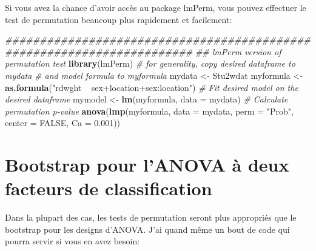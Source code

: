 \documentclass[12pt,]{book}
\newenvironment{Shaded}{\begin{snugshade}}{\end{snugshade}}
\newcommand{\CommentTok}[1]{\textcolor[rgb]{0.37,0.37,0.37}{\textit{#1}}}
\newcommand{\DataTypeTok}[1]{\textcolor[rgb]{0.27,0.27,0.27}{#1}}
\newcommand{\FloatTok}[1]{\textcolor[rgb]{0.06,0.06,0.06}{#1}}
\newcommand{\KeywordTok}[1]{\textcolor[rgb]{0.27,0.27,0.27}{\textbf{#1}}}
\newcommand{\NormalTok}[1]{#1}
\newcommand{\OtherTok}[1]{\textcolor[rgb]{0.37,0.37,0.37}{#1}}
\newcommand{\StringTok}[1]{\textcolor[rgb]{0.5,0.5,0.5}{#1}}
\begin{document}
Si vous avez la chance d'avoir accès au package lmPerm, vous pouvez effectuer le test de permutation beaucoup plus rapidement et facilement:

\begin{Shaded}
\begin{Highlighting}[]
\CommentTok{#######################################################################}
\CommentTok{## lmPerm version of permutation test}
\KeywordTok{library}\NormalTok{(lmPerm)}
\CommentTok{# for generality, copy desired dataframe to mydata}
\CommentTok{# and model formula to myformula}
\NormalTok{mydata <-}\StringTok{ }\NormalTok{Stu2wdat}
\NormalTok{myformula <-}\StringTok{ }\KeywordTok{as.formula}\NormalTok{(}\StringTok{"rdwght ~ sex+location+sex:location"}\NormalTok{)}
\CommentTok{# Fit desired model on the desired dataframe}
\NormalTok{mymodel <-}\StringTok{ }\KeywordTok{lm}\NormalTok{(myformula, }\DataTypeTok{data =}\NormalTok{ mydata)}
\CommentTok{# Calculate permutation p-value}
\KeywordTok{anova}\NormalTok{(}\KeywordTok{lmp}\NormalTok{(myformula, }\DataTypeTok{data =}\NormalTok{ mydata, }\DataTypeTok{perm =} \StringTok{"Prob"}\NormalTok{, }\DataTypeTok{center =} \OtherTok{FALSE}\NormalTok{, }\DataTypeTok{Ca =} \FloatTok{0.001}\NormalTok{))}
\end{Highlighting}
\end{Shaded}

\hypertarget{bootstrap-pour-lanova-uxe0-deux-facteurs-de-classification}{%
\section{Bootstrap pour l'ANOVA à deux facteurs de classification}\label{bootstrap-pour-lanova-uxe0-deux-facteurs-de-classification}}

Dans la plupart des cas, les tests de permutation seront plus appropriés que le bootstrap pour les designs d'ANOVA. J'ai quand même un bout de code qui pourra servir si vous en avez besoin:
\end{document}
